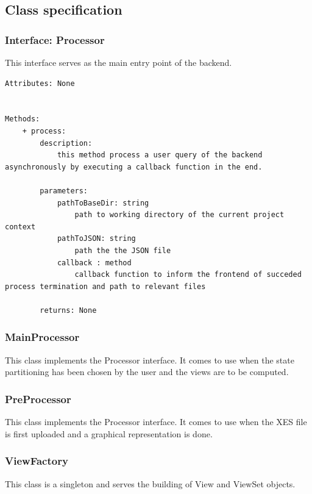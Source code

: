 \documentclass[12pt]{extarticle}
\begin{document}
\subsection{Class specification}

\subsubsection{Interface: Processor}

This interface serves as the main entry point of the backend.

\begin{lstlisting}
Attributes: None


Methods:
    + process:
        description:
            this method process a user query of the backend asynchronously by executing a callback function in the end.
            
        parameters:
            pathToBaseDir: string
                path to working directory of the current project context
            pathToJSON: string
                path the the JSON file
            callback : method
                callback function to inform the frontend of succeded process termination and path to relevant files
                
        returns: None
\end{lstlisting}

\subsubsection{MainProcessor}

This class implements the Processor interface. It comes to use when the state partitioning has been chosen by the user and the views are to be computed.

\subsubsection{PreProcessor}

This class implements the Processor interface. It comes to use when the XES file is first uploaded and a graphical representation is done.

\subsubsection{ViewFactory}

This class is a singleton and serves the building of View and ViewSet objects.
\end{document}
